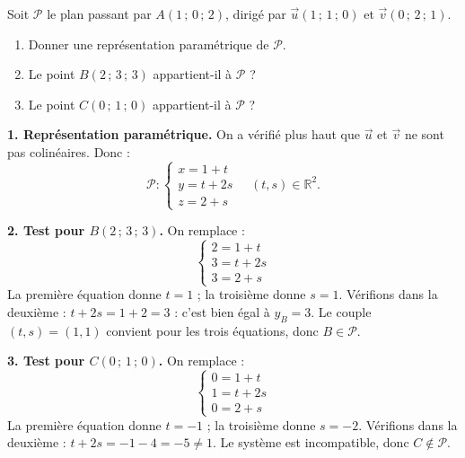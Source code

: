 \documentclass[11pt]{article}
\begin{document}
\begin{exoresolu}
Soit $\mathcal{P}$ le plan passant par $A(1\,;\,0\,;\,2)$, dirigé par $\vec{u}(1\,;\,1\,;\,0)$ et $\vec{v}(0\,;\,2\,;\,1)$.
\begin{enumerate}
  \item Donner une représentation paramétrique de $\mathcal{P}$.
  \item Le point $B(2\,;\,3\,;\,3)$ appartient-il à $\mathcal{P}$ ?
  \item Le point $C(0\,;\,1\,;\,0)$ appartient-il à $\mathcal{P}$ ?
\end{enumerate}
\tcblower
\textbf{1. Représentation paramétrique.} On a vérifié plus haut que $\vec{u}$ et $\vec{v}$ ne sont pas colinéaires. Donc :
\[ \mathcal{P} : \begin{cases} x = 1 + t \\ y = t + 2s \\ z = 2 + s \end{cases} \quad (t,s) \in \mathbb{R}^2. \]

\textbf{2. Test pour $B(2\,;\,3\,;\,3)$.} On remplace :
\[ \begin{cases} 2 = 1 + t \\ 3 = t + 2s \\ 3 = 2 + s \end{cases} \]
La première équation donne $t = 1$ ; la troisième donne $s = 1$. Vérifions dans la deuxième : $t + 2s = 1 + 2 = 3$ : c'est bien égal à $y_B = 3$. Le couple $(t,s) = (1,1)$ convient pour les trois équations, donc $B \in \mathcal{P}$.

\textbf{3. Test pour $C(0\,;\,1\,;\,0)$.} On remplace :
\[ \begin{cases} 0 = 1 + t \\ 1 = t + 2s \\ 0 = 2 + s \end{cases} \]
La première équation donne $t = -1$ ; la troisième donne $s = -2$. Vérifions dans la deuxième : $t + 2s = -1 - 4 = -5 \neq 1$. Le système est incompatible, donc $C \notin \mathcal{P}$.
\end{exoresolu}
\end{document}
